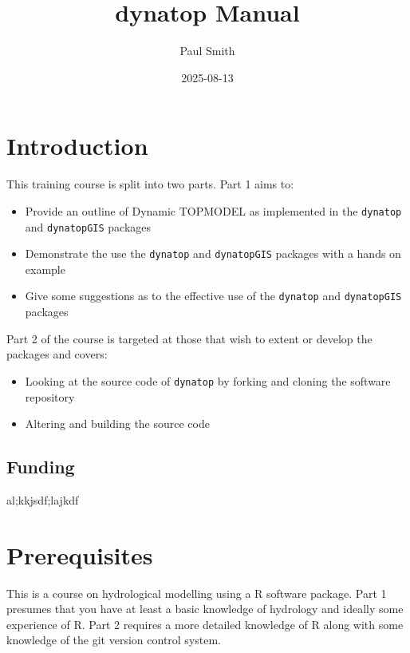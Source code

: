 \documentclass[]{article}
\title{dynatop Manual}
\author{Paul Smith}
\date{2025-08-13}
\begin{document}
\maketitle




\tableofcontents
\section{Introduction}

This training course is split into two parts. Part 1 aims to:

\begin{itemize}
\item Provide an outline of Dynamic TOPMODEL as implemented in the \texttt{dynatop} and
\texttt{dynatopGIS} packages

\item Demonstrate the use the \texttt{dynatop} and
\texttt{dynatopGIS} packages with a hands on example

\item Give some suggestions as to the effective use of the \texttt{dynatop} and
\texttt{dynatopGIS} packages

\end{itemize}

Part 2 of the course is targeted at those that wish to extent or develop the packages and covers:

\begin{itemize}
\item Looking at the source code of \texttt{dynatop} by forking and cloning the software repository

\item Altering and building the source code

\end{itemize}

\subsection{Funding}

al;kkjsdf;lajkdf

\section{Prerequisites}

This is a course on hydrological modelling using a R software package.
Part 1 presumes that you have at least a basic knowledge of hydrology and
ideally some experience of R.
Part 2 requires a more detailed knowledge of R along with some knowledge of
the git version control system.
\end{document}
